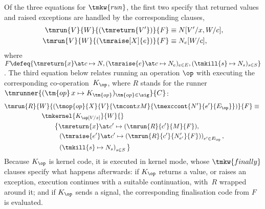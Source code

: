Of the three equations for $\tmkw{run}$, the first two specify that returned values and
raised exceptions are handled by the corresponding clauses,
%
\begin{align*}
  \tmrun{V}{W}{(\tmreturn{V'})}{F} &\equiv N[V'/x, W/c], 
  \\
  \tmrun{V}{W}{(\tmraise[X]{e})}{F} &\equiv N_{e}[W/c],
\end{align*}
%
where
%
$F \defeq \{\tmreturn{x} \at c \mapsto N,
   (\tmraise{e} \at c \mapsto N_e)_{e \in E},
   (\tmkill{s} \mapsto N_s)_{s \in S}
\}$.
%
The third equation below relates running an operation $\op$ with executing the corresponding co-operation~$K_\op$, 
where $R$ stands for the runner
%
$\tmrunner{(\tm{op}\,x \mapsto K_{\tm{op}})_{\tm{op} \in \sig}}{C}$:
%
\begin{multline*}
  \tmrun{R}{W}{(
    \tmop{op}{X}{V}{\tmcont x M}{\tmexccont {N'} {e'} {E_\op}}
    )}{F} \equiv {}
  \\
  \begin{aligned}[t]
     &\tmkernel{K_\op[V/x]}{W}{} \\
     &\qquad\big\{
         \begin{aligned}[t]
           &\tmreturn{x} \at c' \mapsto (\tmrun{R}{c'}{M}{F}), \\
           &\left(
               \tmraise{e'} \at c' \mapsto (\tmrun{R}{c'}{N'_{e'}}{F})
             \right)_{e' \in E_\op},\\
           &\left(
               \tmkill{s} \mapsto N_s
             \right)_{s \in S} \big\}
         \end{aligned}
 \end{aligned}
\end{multline*}
%
Because $K_\op$ is kernel code, it is executed in kernel mode, whose
$\tmkw{finally}$ clauses specify what happens afterwards: if $K_\op$ returns a value, or
raises an exception, execution continues with a suitable continuation, with~$R$
wrapped around it; and if $K_\op$ sends a signal, the corresponding finalisation code from $F$ is
evaluated.

